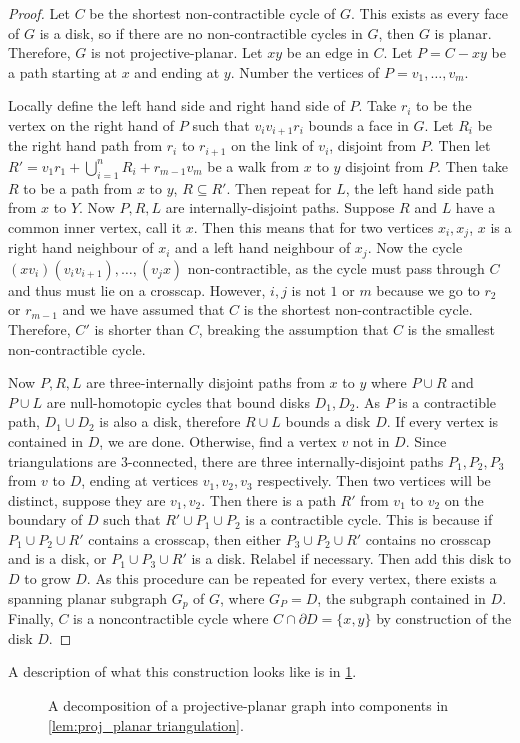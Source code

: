 \begin{proof}
    Let $C$ be the shortest non-contractible cycle of $G$. This exists as every face of $G$ is a disk, so if there are no non-contractible cycles in $G$, then $G$ is planar. Therefore, $G$ is not projective-planar. Let $xy$ be an edge in $C$. Let $P = C - xy$ be a path starting at $x$ and ending at $y$. 
    Number the vertices of $P = v_1, \ldots, v_m$. 

    Locally define the left hand side and right hand side of $P$. Take $r_i$ to be the vertex on the right hand of $P$ such that $v_i v_{i + 1} r_i$ bounds a face in $G$. Let $R_i$ be the right hand path from $r_i$ to $r_{i + 1}$ on the link of $v_i$, disjoint from $P$. Then let $R' = v_1 r_1 + \bigcup_{i = 1}^n R_i + r_{m-1} v_m$ be a walk from $x$ to $y$ disjoint from $P$. Then take $R$ to be a path from $x$ to $y$, $R \subseteq R'$. Then repeat for $L$, the left hand side path from $x$ to $Y$. Now $P, R, L$ are internally-disjoint paths. Suppose $R$ and $L$ have a common inner vertex, call it $x$. Then this means that for two vertices $x_i, x_j$, $x$ is a right hand neighbour of $x_i$ and a left hand neighbour of $x_j$. Now the cycle $(x v_i) (v_i v_{i + 1}), \ldots , (v_j x)$ non-contractible, as the cycle must pass through $C$ and thus must lie on a crosscap. However, $i, j$ is not $1$ or $m$ because we go to $r_2$ or $r_{m-1}$ and we have assumed that $C$ is the shortest non-contractible cycle. Therefore, $C'$ is shorter than $C$, breaking the assumption that $C$ is the smallest non-contractible cycle.

    Now $P, R, L$ are three-internally disjoint paths from $x$ to $y$ where $P \cup R$ and $P \cup L$ are null-homotopic cycles that bound disks $D_1, D_2$. As $P$ is a contractible path, $D_1 \cup D_2$ is also a disk, therefore $R \cup L$ bounds a disk $D$. If every vertex is contained in $D$, we are done. Otherwise, find a vertex $v$ not in $D$. Since triangulations are 3-connected, there are three internally-disjoint paths $P_1, P_2, P_3$ from $v$ to $D$, ending at vertices $v_1, v_2, v_3$ respectively. Then two vertices will be distinct, suppose they are $v_1, v_2$. Then there is a path $R'$ from $v_1$ to $v_2$ on the boundary of $D$ such that $R' \cup P_1 \cup P_2$ is a contractible cycle. This is because if $P_1 \cup P_2 \cup R'$ contains a crosscap, then either $P_3 \cup P_2 \cup R'$ contains no crosscap and is a disk, or $P_1 \cup P_3 \cup R'$ is a disk. Relabel if necessary. Then add this disk to $D$ to grow $D$. As this procedure can be repeated for every vertex, there exists a spanning planar subgraph $G_p$ of $G$, where $G_P = D$, the subgraph contained in $D$. Finally, $C$ is a noncontractible cycle where $C \cap \partial D = \{x, y\}$ by construction of the disk $D$. 
\end{proof}
A description of what this construction looks like is in \cref{fig:projectiveplanardecomp}.
\begin{figure}[h]
    \centering
    
    \caption[Projective-Planar decomposition]{A decomposition of a projective-planar graph into components in \cref{lem:proj_planar triangulation}.}\label{fig:projectiveplanardecomp}
\end{figure}

